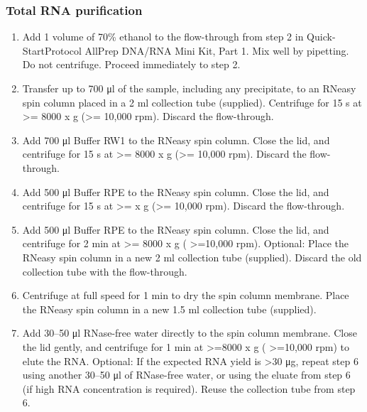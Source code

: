 \subsubsection{Total RNA purification}
\begin{enumerate}
\item Add 1 volume of 70\% ethanol to the flow-through from step 2 in Quick- StartProtocol AllPrep DNA/RNA Mini Kit, Part 1. Mix well by pipetting. Do not centrifuge. Proceed immediately to step 2.
\item Transfer up to 700 μl of the sample, including any precipitate, to an RNeasy spin column placed in a 2 ml collection tube (supplied). Centrifuge for 15 s at >= 8000 x g (>= 10,000 rpm). Discard the flow-through.
\item Add 700 μl Buffer RW1 to the RNeasy spin column. Close the lid, and
centrifuge for 15 s at >= 8000 x g (>= 10,000 rpm). Discard the flow-through.
\item Add 500 μl Buffer RPE to the RNeasy spin column. Close the lid, and
centrifuge for 15 s at >=  x g (>= 10,000 rpm). Discard the flow-through.
\item Add 500 μl Buffer RPE to the RNeasy spin column. Close the lid, and centrifuge for 2 min at >= 8000 x g ( >=10,000 rpm).
Optional: Place the RNeasy spin column in a new 2 ml collection tube (supplied). Discard the old collection tube with the flow-through. 
\item Centrifuge at full speed for 1 min to dry the spin column membrane.
Place the RNeasy spin column in a new 1.5 ml collection tube (supplied). \item Add 30–50 μl RNase-free water directly to the spin column membrane. Close the lid gently, and centrifuge for 1 min at >=8000 x g ( >=10,000 rpm) to elute the RNA.
Optional: If the expected RNA yield is >30 μg, repeat step 6 using another 30–50 μl of RNase-free water, or using the eluate from step 6 (if high RNA concentration is required). Reuse the collection tube from step 6.
\end{enumerate}

